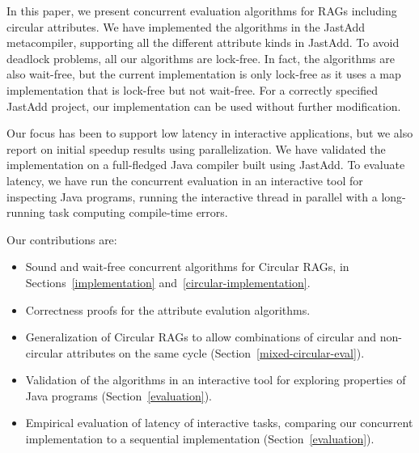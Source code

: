 {%
In this paper, we present concurrent evaluation algorithms for RAGs including circular attributes. We have implemented the algorithms in the JastAdd metacompiler, supporting all the different attribute kinds in JastAdd.
To avoid deadlock problems, all our algorithms are lock-free.
In fact, the algorithms are also wait-free, but the current implementation is only lock-free as it uses a map implementation that is lock-free but not wait-free.
For a correctly specified JastAdd project, our implementation can be used without further
modification.
%
%

Our focus has been to support low latency in interactive applications, but we also report on initial speedup results using parallelization.
We have validated the implementation on a full-fledged Java compiler built using JastAdd.
To evaluate latency, we have run the concurrent evaluation in an interactive tool for inspecting Java programs, running the interactive thread in parallel with a long-running task computing compile-time errors.



Our contributions are:

\begin{itemize}
  \item Sound and wait-free concurrent algorithms for Circular RAGs,
    in Sections~\ref{implementation} and~\ref{circular-implementation}.
  \item Correctness proofs for the attribute evalution algorithms.
  \item Generalization of Circular RAGs to allow combinations of circular and non-circular attributes on the same cycle (Section~\ref{mixed-circular-eval}).
  \item Validation of the algorithms in an interactive tool for exploring properties of
    Java programs (Section~\ref{evaluation}).
  \item Empirical evaluation of latency of interactive tasks, comparing our concurrent
    implementation to a sequential implementation (Section~\ref{evaluation}).
\end{itemize}

}
